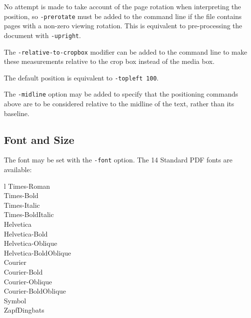 \documentclass[a4paper,makeidx]{memoir}
\begin{document}
\noindent No attempt is made to take account of the page rotation when interpreting the
position, so \texttt{-prerotate} must be added to the command line if the file
contains pages with a non-zero viewing rotation. This is equivalent to
pre-processing the document with \texttt{-upright}.
   

The \texttt{-relative-to-cropbox} modifier can be added to the command line to
make these measurements relative to the crop box instead of the media box.

The default position is equivalent to \texttt{-topleft 100}.

The \texttt{-midline} option may be added to specify that the positioning
commands above are to be considered relative to the midline of the text, rather
than its baseline.

  \subsection{Font and Size}
  The font may be set with the \texttt{-font} option. The 14 Standard PDF fonts are available:

  \vspace{2mm}
  \begin{ctabular}{l}
  Times-Roman\\
  Times-Bold\\
  Times-Italic\\
  Times-BoldItalic\\
  Helvetica\\
  Helvetica-Bold\\
  Helvetica-Oblique\\
  Helvetica-BoldOblique\\
  Courier\\
  Courier-Bold\\
  Courier-Oblique\\
  Courier-BoldOblique\\
  Symbol\\
  ZapfDingbats
  \end{ctabular}
\end{document}
